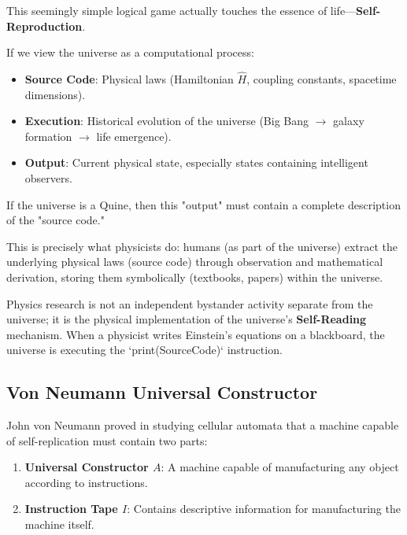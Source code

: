 This seemingly simple logical game actually touches the essence of life—\textbf{Self-Reproduction}.

If we view the universe as a computational process:

\begin{itemize}
\item \textbf{Source Code}: Physical laws (Hamiltonian $\hat{H}$, coupling constants, spacetime dimensions).

\item \textbf{Execution}: Historical evolution of the universe (Big Bang $\to$ galaxy formation $\to$ life emergence).

\item \textbf{Output}: Current physical state, especially states containing intelligent observers.
\end{itemize}

If the universe is a Quine, then this "output" must contain a complete description of the "source code."

This is precisely what physicists do: humans (as part of the universe) extract the underlying physical laws (source code) through observation and mathematical derivation, storing them symbolically (textbooks, papers) within the universe.

\begin{corollary}
Physics research is not an independent bystander activity separate from the universe; it is the physical implementation of the universe's \textbf{Self-Reading} mechanism. When a physicist writes Einstein's equations on a blackboard, the universe is executing the `print(SourceCode)` instruction.
\end{corollary}

\subsection{Von Neumann Universal Constructor}

John von Neumann proved in studying cellular automata that a machine capable of self-replication must contain two parts:

\begin{enumerate}
\item \textbf{Universal Constructor $A$}: A machine capable of manufacturing any object according to instructions.

\item \textbf{Instruction Tape $I$}: Contains descriptive information for manufacturing the machine itself.
\end{enumerate}

